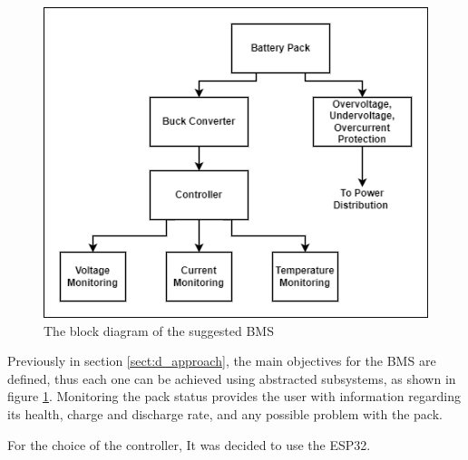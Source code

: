 \begin{figure}[h!]
    \centering
    \includegraphics[scale=0.5]{./Figures/HW/BMS-drawing.png}
    \caption{The block diagram of the suggested BMS}
    \label{fig:hw-power-blk2}
\end{figure}

Previously in section \ref{sect:d_approach}, the main objectives for the BMS are defined, thus each one can be achieved using abstracted subsystems, as shown in figure \ref{fig:hw-power-blk2}. Monitoring the pack status provides the user with information regarding its health, charge and discharge rate, and any possible problem with the pack.



 For the choice of the controller, It was decided to use the ESP32. %


